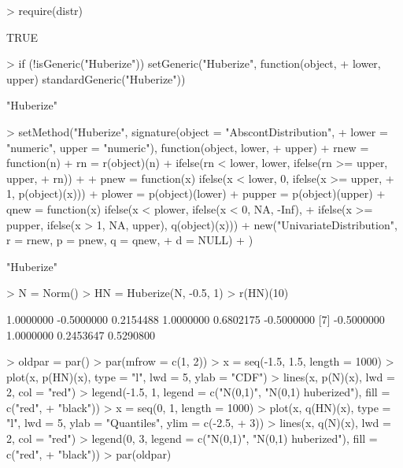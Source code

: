 \documentclass[11pt]{article}
\begin{document}
\begin{Schunk}
\begin{Sinput}
> require(distr)
\end{Sinput}
\begin{Soutput}
[1] TRUE
\end{Soutput}
\begin{Sinput}
> if (!isGeneric("Huberize")) setGeneric("Huberize", function(object, 
+     lower, upper) standardGeneric("Huberize"))
\end{Sinput}
\begin{Soutput}
[1] "Huberize"
\end{Soutput}
\begin{Sinput}
> setMethod("Huberize", signature(object = "AbscontDistribution", 
+     lower = "numeric", upper = "numeric"), function(object, lower, 
+     upper) {
+     rnew = function(n) {
+         rn = r(object)(n)
+         ifelse(rn < lower, lower, ifelse(rn >= upper, upper, 
+             rn))
+     }
+     pnew = function(x) ifelse(x < lower, 0, ifelse(x >= upper, 
+         1, p(object)(x)))
+     plower = p(object)(lower)
+     pupper = p(object)(upper)
+     qnew = function(x) ifelse(x < plower, ifelse(x < 0, NA, -Inf), 
+         ifelse(x >= pupper, ifelse(x > 1, NA, upper), q(object)(x)))
+     new("UnivariateDistribution", r = rnew, p = pnew, q = qnew, 
+         d = NULL)
+ })
\end{Sinput}
\begin{Soutput}
[1] "Huberize"
\end{Soutput}
\begin{Sinput}
> N = Norm()
> HN = Huberize(N, -0.5, 1)
> r(HN)(10)
\end{Sinput}
\begin{Soutput}
 [1]  1.0000000 -0.5000000  0.2154488  1.0000000  0.6802175 -0.5000000
 [7] -0.5000000  1.0000000  0.2453647  0.5290800
\end{Soutput}
\begin{Sinput}
> oldpar = par()
> par(mfrow = c(1, 2))
> x = seq(-1.5, 1.5, length = 1000)
> plot(x, p(HN)(x), type = "l", lwd = 5, ylab = "CDF")
> lines(x, p(N)(x), lwd = 2, col = "red")
> legend(-1.5, 1, legend = c("N(0,1)", "N(0,1) huberized"), fill = c("red", 
+     "black"))
> x = seq(0, 1, length = 1000)
> plot(x, q(HN)(x), type = "l", lwd = 5, ylab = "Quantiles", ylim = c(-2.5, 
+     3))
> lines(x, q(N)(x), lwd = 2, col = "red")
> legend(0, 3, legend = c("N(0,1)", "N(0,1) huberized"), fill = c("red", 
+     "black"))
> par(oldpar)
\end{Sinput}
\end{Schunk}
\end{document}
